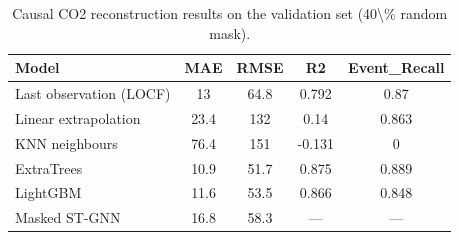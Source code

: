 \begin{table}[t]
\centering
\caption{Causal CO2 reconstruction results on the validation set (40\textbackslash{}\% random mask).}
\label{tab:reconstruction}
\begin{tabular}{lcccc}
\toprule
Model & MAE & RMSE & R2 & Event\_Recall \\
\midrule
Last observation (LOCF) & 13 & 64.8 & 0.792 & 0.87 \\
Linear extrapolation & 23.4 & 132 & 0.14 & 0.863 \\
KNN neighbours & 76.4 & 151 & -0.131 & 0 \\
ExtraTrees & 10.9 & 51.7 & 0.875 & 0.889 \\
LightGBM & 11.6 & 53.5 & 0.866 & 0.848 \\
Masked ST-GNN & 16.8 & 58.3 & --- & --- \\
\bottomrule
\end{tabular}
\end{table}
